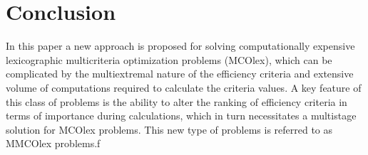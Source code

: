 \documentclass[smallextended]{svjour3}       %
\begin{document}
\begin{table}[ht]
\centering
\caption{Results of the numerical experiments to solve two-criteria four-dimensional MCO problems}
\label{tab:5}
\end{table}


\section{Conclusion}
\label{sec:6}

In this paper a new approach is proposed for solving computationally expensive lexicographic multicriteria optimization problems (MCOlex), which can be complicated by the multiextremal nature of the efficiency criteria and extensive volume of computations required to calculate the criteria values. A key feature of this class of problems is the ability to alter the ranking of efficiency criteria in terms of importance during calculations, which in turn necessitates a multistage solution for MCOlex problems. This new type of problems is referred to as MMCOlex problems.f
\end{document}
